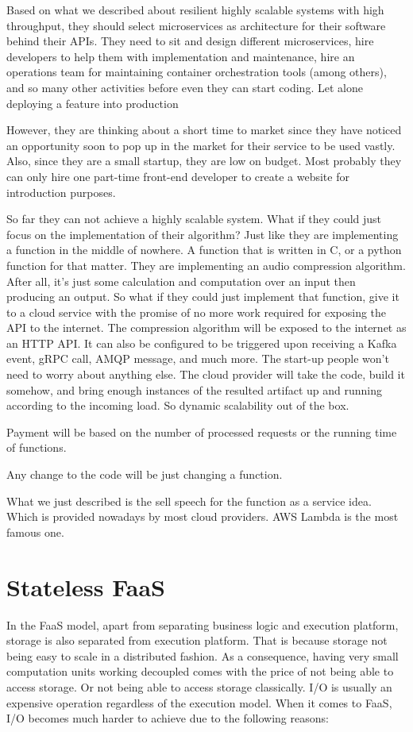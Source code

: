 \documentclass[a4]{report}
\begin{document}
    Based on what we described about resilient highly scalable systems with high throughput, they should select
    microservices as architecture for their software behind their APIs.
    They need to sit and design different microservices, hire developers to help them with implementation and
    maintenance, hire an operations team for maintaining container orchestration tools (among others), and so many
    other activities before even they can start coding.
    Let alone deploying a feature into production

    However, they are thinking about a short time to market since they have noticed an opportunity soon to pop up in
    the market for their service to be used vastly.
    Also, since they are a small startup, they are low on budget.
    Most probably they can only hire one part-time front-end developer to create a website for introduction purposes.

    So far they can not achieve a highly scalable system.
    What if they could just focus on the implementation of their algorithm?
    Just like they are implementing a function in the middle of nowhere.
    A function that is written in C, or a python function for that matter.
    They are implementing an audio compression algorithm.
    After all, it's just some calculation and computation over an input then producing an output.
    So what if they could just implement that function, give it to a cloud service with the promise of no more work required for exposing the API to the internet.
    The compression algorithm will be exposed to the internet as an HTTP API.
    It can also be configured to be triggered upon receiving a Kafka event, gRPC call, AMQP message, and much more.
    The start-up people won't need to worry about anything else.
    The cloud provider will take the code, build it somehow, and bring enough instances of the resulted artifact up and running according to the incoming load.
    So dynamic scalability out of the box.

    Payment will be based on the number of processed requests or the running time of functions.

    Any change to the code will be just changing a function.

    What we just described is the sell speech for the function as a service idea.
    Which is provided nowadays by most cloud providers.
    AWS Lambda is the most famous one.


    \section{Stateless FaaS}
    In the FaaS model, apart from separating business logic and execution platform, storage is also separated from
    execution platform.
    That is because storage not being easy to scale in a distributed fashion.
    As a consequence, having very small computation units working decoupled comes with the price of not being able to access storage.
    Or not being able to access storage classically.
    I/O is usually an expensive operation regardless of the execution model.
    When it comes to FaaS, I/O becomes much harder to achieve due to the following reasons:
\end{document}

